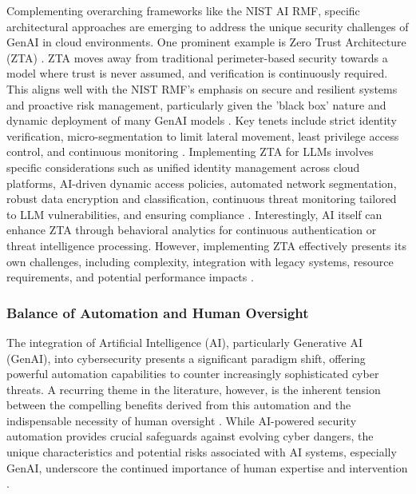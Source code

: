 Complementing overarching frameworks like the NIST AI RMF, specific architectural approaches are emerging to address the unique security challenges of GenAI in cloud environments. One prominent example is Zero Trust Architecture (ZTA) \cite{noauthor_zero-trust_nodate}. ZTA moves away from traditional perimeter-based security towards a model where trust is never assumed, and verification is continuously required\cite{noauthor_zero-trust_nodate}. This aligns well with the NIST RMF's emphasis on secure and resilient systems and proactive risk management, particularly given the 'black box' nature and dynamic deployment of many GenAI models \cite{noauthor_zero-trust_nodate, tabassi_artificial_2023}. Key tenets include strict identity verification, micro-segmentation to limit lateral movement, least privilege access control, and continuous monitoring \cite{noauthor_zero-trust_nodate}. Implementing ZTA for LLMs involves specific considerations such as unified identity management across cloud platforms, AI-driven dynamic access policies, automated network segmentation, robust data encryption and classification, continuous threat monitoring tailored to LLM vulnerabilities, and ensuring compliance \cite{noauthor_zero-trust_nodate}. Interestingly, AI itself can enhance ZTA through behavioral analytics for continuous authentication or threat intelligence processing\cite{noauthor_zero-trust_nodate}. However, implementing ZTA effectively presents its own challenges, including complexity, integration with legacy systems, resource requirements, and potential performance impacts \cite{noauthor_zero-trust_nodate}.

\subsubsection{Balance of Automation and Human Oversight} %
\label{sec:Balance of Automation and Human Oversight}

The integration of Artificial Intelligence (AI), particularly Generative AI (GenAI), into cybersecurity presents a significant paradigm shift, offering powerful automation capabilities to counter increasingly sophisticated cyber threats. A recurring theme in the literature, however, is the inherent tension between the compelling benefits derived from this automation and the indispensable necessity of human oversight \cite{seth_ai_2025}. While AI-powered security automation provides crucial safeguards against evolving cyber dangers, the unique characteristics and potential risks associated with AI systems, especially GenAI, underscore the continued importance of human expertise and intervention \cite{seth_ai_2025, patel_generative_2025}.

